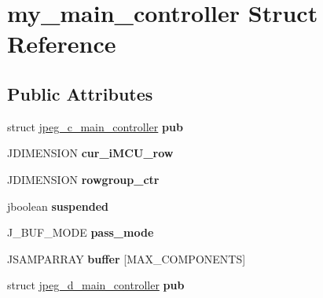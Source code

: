 \hypertarget{structmy__main__controller}{}\section{my\+\_\+main\+\_\+controller Struct Reference}
\label{structmy__main__controller}
\subsection*{Public Attributes}
\begin{DoxyCompactItemize}
\item 
struct \hyperlink{structjpeg__c__main__controller}{jpeg\+\_\+c\+\_\+main\+\_\+controller} {\bfseries pub}\hypertarget{structmy__main__controller_af6cfb28f856f55e4a715c8036f08c52f}{}\label{structmy__main__controller_af6cfb28f856f55e4a715c8036f08c52f}

\item 
J\+D\+I\+M\+E\+N\+S\+I\+ON {\bfseries cur\+\_\+i\+M\+C\+U\+\_\+row}\hypertarget{structmy__main__controller_a1c6081c98910d41e03fa33763a832a6f}{}\label{structmy__main__controller_a1c6081c98910d41e03fa33763a832a6f}

\item 
J\+D\+I\+M\+E\+N\+S\+I\+ON {\bfseries rowgroup\+\_\+ctr}\hypertarget{structmy__main__controller_a41bedbcd86bdc7611550440e02b8f93b}{}\label{structmy__main__controller_a41bedbcd86bdc7611550440e02b8f93b}

\item 
jboolean {\bfseries suspended}\hypertarget{structmy__main__controller_ae78bd0794a0b9e818996b38c71c59df5}{}\label{structmy__main__controller_ae78bd0794a0b9e818996b38c71c59df5}

\item 
J\+\_\+\+B\+U\+F\+\_\+\+M\+O\+DE {\bfseries pass\+\_\+mode}\hypertarget{structmy__main__controller_a2de588274979de6f92951740a6e9d0ac}{}\label{structmy__main__controller_a2de588274979de6f92951740a6e9d0ac}

\item 
J\+S\+A\+M\+P\+A\+R\+R\+AY {\bfseries buffer} \mbox{[}M\+A\+X\+\_\+\+C\+O\+M\+P\+O\+N\+E\+N\+TS\mbox{]}\hypertarget{structmy__main__controller_a448676ac307b69b99e5457744515f058}{}\label{structmy__main__controller_a448676ac307b69b99e5457744515f058}

\item 
struct \hyperlink{structjpeg__d__main__controller}{jpeg\+\_\+d\+\_\+main\+\_\+controller} {\bfseries pub}\hypertarget{structmy__main__controller_a4880459c57978ea5fcfef2a1acbfc3fe}{}\label{structmy__main__controller_a4880459c57978ea5fcfef2a1acbfc3fe}


\end{DoxyCompactItemize}
